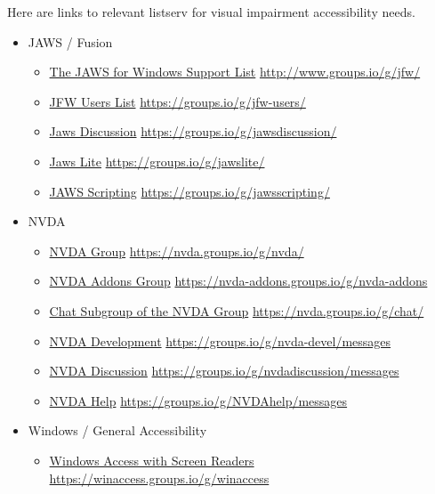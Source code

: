 \documentclass[14pt,letterpaper,twoside]{extreport}
\begin{document}
\begin{appendices}
Here are links to relevant listserv for visual impairment accessibility needs.
\begin{itemize}[leftmargin=*]
\item JAWS / Fusion
\begin{itemize}[leftmargin=2em]
\item \href{http://www.groups.io/g/jfw/}{The JAWS for Windows Support List}  \break\url{http://www.groups.io/g/jfw/} 
\item \href{https://groups.io/g/jfw-users/}{JFW Users List}  \break\url{https://groups.io/g/jfw-users/}
\item \href{https://groups.io/g/jawsdiscussion/}{Jaws Discussion}  \break\url{https://groups.io/g/jawsdiscussion/}
\item \href{https://groups.io/g/jawslite/}{Jaws Lite}  \break\url{https://groups.io/g/jawslite/}
\item \href{https://groups.io/g/jawsscripting/}{JAWS Scripting}  \break\url{https://groups.io/g/jawsscripting/}
\end{itemize}
\item NVDA
\begin{itemize}[leftmargin=2em]
\item \href{https://nvda.groups.io/g/nvda/ }{NVDA Group}  \break\url{https://nvda.groups.io/g/nvda/ }
\item \href{https://nvda-addons.groups.io/g/nvda-addons}{NVDA Addons Group}  \break\url{https://nvda-addons.groups.io/g/nvda-addons}
\item \href{ https://nvda.groups.io/g/chat/ }{Chat Subgroup of the NVDA Group}  \break\url{ https://nvda.groups.io/g/chat/ }
\item \href{https://groups.io/g/nvda-devel/messages}{NVDA Development}  \break\url{https://groups.io/g/nvda-devel/messages}
\item \href{https://groups.io/g/nvdadiscussion/messages}{NVDA Discussion}  \break\url{https://groups.io/g/nvdadiscussion/messages}
\item \href{https://groups.io/g/NVDAhelp/messages}{NVDA Help}  \break\url{https://groups.io/g/NVDAhelp/messages}
\end{itemize}
\item Windows / General Accessibility
\begin{itemize}[leftmargin=2em]
\item \href{https://winaccess.groups.io/g/winaccess}{Windows Access with Screen Readers}  \break\url{https://winaccess.groups.io/g/winaccess}
\end{itemize}

\end{itemize}
\end{appendices}
\end{document}
